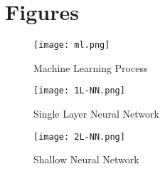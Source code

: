 
\section{Figures}\label{section:figs}
\begin{figure}[h]
 \centering
 \texttt{[image: ml.png]}
  \caption{Machine Learning Process}\label{fig:learn}
\end{figure}

\begin{figure}
 \centering
 \texttt{[image: 1L-NN.png]}
 \caption{Single Layer Neural Network}
 \label{fig:single}
\end{figure}

\begin{figure}
 \centering
 \texttt{[image: 2L-NN.png]}
 \caption{Shallow Neural Network}
 \label{fig:shallow}
\end{figure}
